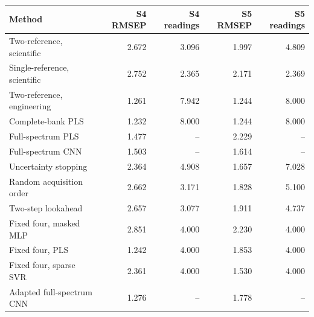 \begin{tabular}{lrrrr}
\toprule
Method & S4 RMSEP & S4 readings & S5 RMSEP & S5 readings \\
\midrule
Two-reference, scientific & 2.672 & 3.096 & 1.997 & 4.809 \\
Single-reference, scientific & 2.752 & 2.365 & 2.171 & 2.369 \\
Two-reference, engineering & 1.261 & 7.942 & 1.244 & 8.000 \\
Complete-bank PLS & 1.232 & 8.000 & 1.244 & 8.000 \\
Full-spectrum PLS & 1.477 & -- & 2.229 & -- \\
Full-spectrum CNN & 1.503 & -- & 1.614 & -- \\
Uncertainty stopping & 2.364 & 4.908 & 1.657 & 7.028 \\
Random acquisition order & 2.662 & 3.171 & 1.828 & 5.100 \\
Two-step lookahead & 2.657 & 3.077 & 1.911 & 4.737 \\
Fixed four, masked MLP & 2.851 & 4.000 & 2.230 & 4.000 \\
Fixed four, PLS & 1.242 & 4.000 & 1.853 & 4.000 \\
Fixed four, sparse SVR & 2.361 & 4.000 & 1.530 & 4.000 \\
Adapted full-spectrum CNN & 1.276 & -- & 1.778 & -- \\
\bottomrule
\end{tabular}
